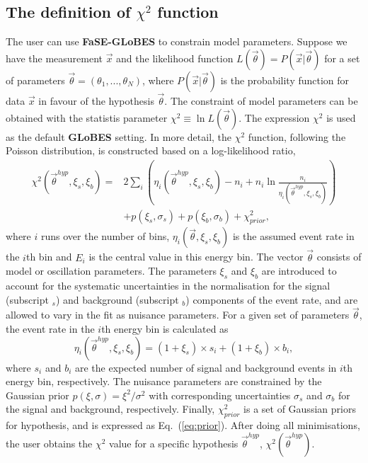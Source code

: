 \documentclass[aps,prd,nofootinbib,preprint]{revtex4}
\begin{document}

\subsection{The definition of $\chi^2$ function}


The user can use \textbf{FaSE-GLoBES} to constrain model parameters. 
Suppose we have the measurement $\vec{x}$ and the likelihood function $L(\vec{\theta})=P(\vec{x}|\vec{\theta})$ for a set of parameters $\vec{\theta}=(\theta_1,...,\theta_N)$, where $P(\vec{x}|\vec{\theta})$ is the probability function for data $\vec{x}$ in favour of the hypothesis $\vec{\theta}$. The constraint of model parameters can be obtained with the statistis parameter $\chi^2\equiv \ln L(\vec{\theta})$.
The expression $\chi^2$ is used as the default \textbf{GLoBES} setting. In more detail, the $\chi^2$ function, following the Poisson distribution, is constructed based on a log-likelihood ratio,
\begin{align}\label{eq:chi-squared}
\chi^2(\vec{\theta}^{hyp},\xi_s,\xi_b)=&2\sum_i\left(\eta_i(\vec{\theta}^{hyp},\xi_s,\xi_b)-n_i+n_i\ln\frac{n_i}{\eta_i(\vec{\theta}^{hyp},\xi_s,\xi_b)} \right)\nonumber\\
&+p(\xi_s,\sigma_s)+p(\xi_b,\sigma_b)+\chi^2_{prior},
\end{align}
where $i$ runs over the number of bins, $\eta_i(\vec{\theta},\xi_s,\xi_b)$ is the assumed event rate in the $i$th bin and $E_i$ is the central value in this energy bin. The vector $\vec{\theta}$ consists of model or oscillation parameters. The parameters $\xi_s$ and $\xi_b$ are introduced to account for the systematic uncertainties in the normalisation for the signal (subscript $_s$) and background (subscript $_b$) components of the event rate, and are allowed to vary in the fit as nuisance parameters. For a given set of parameters $\vec{\theta}$, the event rate in the $i$th energy bin is calculated as\\
\begin{equation}
\eta_i(\vec{\theta}^{hyp},\xi_s,\xi_b)=(1+\xi_s)\times s_i+(1+\xi_b)\times b_i,
\end{equation}
where $s_i$ and $b_i$ are the expected number of signal and background events in $i$th energy bin, respectively. The nuisance parameters are constrained by the Gaussian prior $p(\xi,\sigma)=\xi^2/\sigma^2$ with corresponding uncertainties $\sigma_s$ and $\sigma_b$ for the signal and background, respectively. Finally, $\chi^2_{prior}$ is a set of Gaussian priors for hypothesis, and is expressed as Eq.~(\ref{eq:prior}). After doing all minimisations, the user obtains the $\chi^2$ value for a specific hypothesis $\vec{\theta}^{hyp}$, $\chi^2(\vec{\theta}^{hyp})$.
\end{document}

